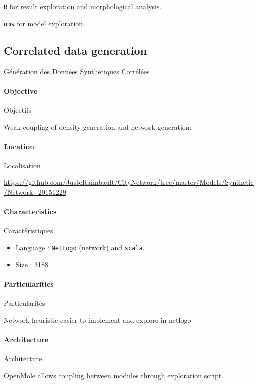 \texttt{R} for result exploration and morphological analysis.

\texttt{oms} for model exploration.





\subsection{Correlated data generation}{Génération des Données Synthétiques Corrélées}

\paragraph{Objective}{Objectifs}

Weak coupling of density generation and network generation.

\paragraph{Location}{Localisation}

\url{https://github.com/JusteRaimbault/CityNetwork/tree/master/Models/Synthetic/Network_20151229}

\paragraph{Characteristics}{Caractéristiques}

\begin{itemize}
\item Language : \texttt{NetLogo} (network) and \texttt{scala}.
\item Size : 3188
\end{itemize}


\paragraph{Particularities}{Particularités}

Network heuristic easier to implement and explore in netlogo

\paragraph{Architecture}{Architecture}

OpenMole allows coupling between modules through exploration script.

